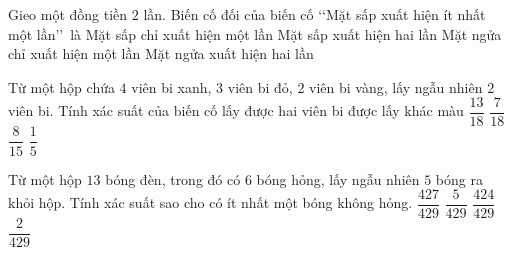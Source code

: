 \begin{ex}%
	Gieo một đồng tiền $2$ lần. Biến cố đối của biến cố \lq\lq Mặt sấp xuất hiện ít nhất một lần\rq\rq\, là 
	\choice
	{Mặt sấp chỉ xuất hiện một lần}
	{Mặt sấp xuất hiện hai lần}
	{Mặt ngửa chỉ xuất hiện một lần}
	{\True Mặt ngửa xuất hiện hai lần}
\end{ex}

\begin{ex}%
	Từ một hộp chứa $4$ viên bi xanh, $3$ viên bi đỏ, $2$ viên bi vàng, lấy ngẫu nhiên $2$ viên bi. Tính xác suất của biến cố lấy được hai viên bi được lấy khác màu
	\choice
	{\True $\dfrac{13}{18}$}
	{$\dfrac{7}{18}$}
	{$\dfrac{8}{15}$}
	{$\dfrac{1}{5}$}
\end{ex}

\begin{ex}%
	Từ một hộp $13$ bóng đèn, trong đó có $6$ bóng hỏng, lấy ngẫu nhiên $5$ bóng ra khỏi hộp. Tính xác suất sao cho có ít nhất một bóng không hỏng.
	\choice
	{\True $\dfrac{427}{429}$}
	{$\dfrac{5}{429}$}
	{$\dfrac{424}{429}$}
	{$\dfrac{2}{429}$}
\end{ex}

